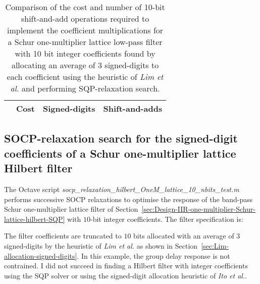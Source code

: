 \documentclass[a4paper,twoside,10pt,english]{report}
\begin{document}
\begin{table}[htb]
\centering
\begin{threeparttable}
\begin{tabular}{lccc}  \\ \toprule
& Cost&Signed-digits&Shift-and-adds\\ \midrule

\bottomrule
\end{tabular}
\end{threeparttable}
\caption[Summary of cost results for the Schur one-multiplier lattice 
bandpass filter SQP-relaxation algorithm example with 10 bit coefficients]
{Comparison of the cost and number of 10-bit shift-and-add operations required 
  to implement the coefficient multiplications for a Schur one-multiplier 
  lattice low-pass filter with 10 bit integer coefficients found by allocating 
  an average of 3 signed-digits to each coefficient using the heuristic of 
  \emph{Lim et al.} and performing SQP-relaxation search.}
\label{tab:sqp-relax-schurOneMlattice-lowpass-10-nbits-cost-summary}
\end{table}
\subsection{\label{sec:SOCP-relaxation-search-signed-digit-coefficients-hilbert}SOCP-relaxation search for the signed-digit coefficients of a Schur one-multiplier lattice Hilbert filter}

The Octave script 
\emph{socp\_relaxation\_hilbert\_OneM\_lattice\_10\_nbits\_test.m} performs
successive SOCP relaxations to optimise the response of the band-pass Schur
one-multiplier lattice filter of
Section~\ref{sec:Design-IIR-one-multiplier-Schur-lattice-hilbert-SQP} with
$10$-bit integer coefficients. The filter specification is:
\begin{small}

\end{small} 
The filter coefficients are truncated to $10$ bits allocated with an average
of $3$ signed-digits by the heuristic of \emph{Lim et al.} as shown in
Section~\ref{sec:Lim-allocation-signed-digits}. In this example, the group
delay response is not contrained. I did not succeed in finding a Hilbert
filter with integer coefficients using the SQP solver or using the
signed-digit allocation heuristic of \emph{Ito et al.}.
\end{document}
